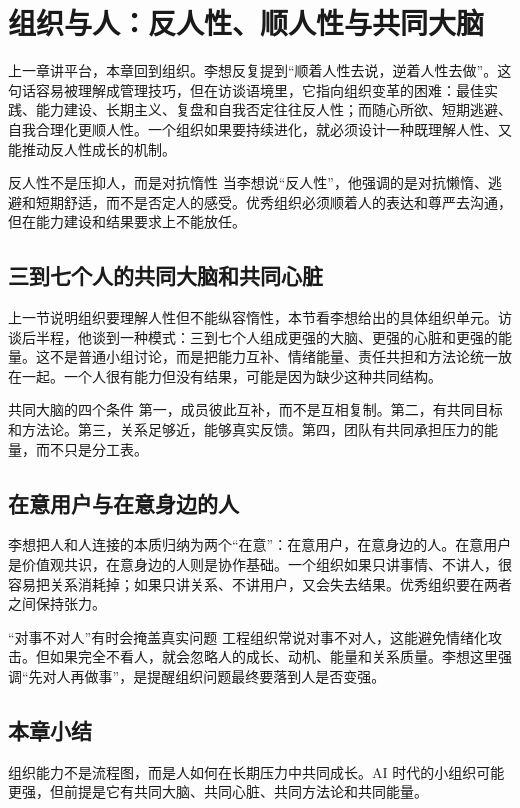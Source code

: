 \section{组织与人：反人性、顺人性与共同大脑}

上一章讲平台，本章回到组织。李想反复提到“顺着人性去说，逆着人性去做”。这句话容易被理解成管理技巧，但在访谈语境里，它指向组织变革的困难：最佳实践、能力建设、长期主义、复盘和自我否定往往反人性；而随心所欲、短期逃避、自我合理化更顺人性。一个组织如果要持续进化，就必须设计一种既理解人性、又能推动反人性成长的机制。

\begin{knowledgebox}{反人性不是压抑人，而是对抗惰性}
当李想说“反人性”，他强调的是对抗懒惰、逃避和短期舒适，而不是否定人的感受。优秀组织必须顺着人的表达和尊严去沟通，但在能力建设和结果要求上不能放任。
\end{knowledgebox}

\subsection{三到七个人的共同大脑和共同心脏}

上一节说明组织要理解人性但不能纵容惰性，本节看李想给出的具体组织单元。访谈后半程，他谈到一种模式：三到七个人组成更强的大脑、更强的心脏和更强的能量。这不是普通小组讨论，而是把能力互补、情绪能量、责任共担和方法论统一放在一起。一个人很有能力但没有结果，可能是因为缺少这种共同结构。

\begin{importantbox}{共同大脑的四个条件}
第一，成员彼此互补，而不是互相复制。第二，有共同目标和方法论。第三，关系足够近，能够真实反馈。第四，团队有共同承担压力的能量，而不只是分工表。
\end{importantbox}

\subsection{在意用户与在意身边的人}

李想把人和人连接的本质归纳为两个“在意”：在意用户，在意身边的人。在意用户是价值观共识，在意身边的人则是协作基础。一个组织如果只讲事情、不讲人，很容易把关系消耗掉；如果只讲关系、不讲用户，又会失去结果。优秀组织要在两者之间保持张力。

\begin{warningbox}{“对事不对人”有时会掩盖真实问题}
工程组织常说对事不对人，这能避免情绪化攻击。但如果完全不看人，就会忽略人的成长、动机、能量和关系质量。李想这里强调“先对人再做事”，是提醒组织问题最终要落到人是否变强。
\end{warningbox}

\subsection{本章小结}

组织能力不是流程图，而是人如何在长期压力中共同成长。AI 时代的小组织可能更强，但前提是它有共同大脑、共同心脏、共同方法论和共同能量。

